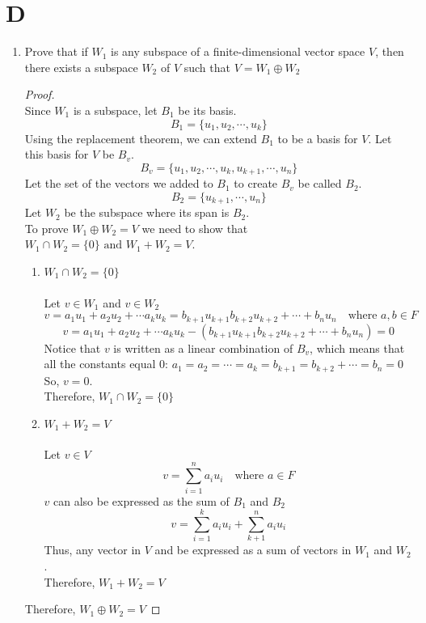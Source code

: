 \documentclass[11pt]{scrartcl}
\begin{document}
\section{D}
\begin{enumerate}[label=\alph*.]
	\item{
			Prove that if $W_1$ is any subspace of a finite-dimensional vector space $V$, then there exists a subspace $W_2$ of	$V$ such that $V = W_1 \oplus W_2 $
			\begin{proof}
			\-\\
			Since $W_1$ is a subspace, let $B_1$ be its basis.
			$$B_1 = \{u_1, u_2, \cdots, u_k\}$$
			Using the replacement theorem, we can extend $B_1$ to be a basis for $V$. Let this basis for $V$ be $B_v$.
			$$B_v = \{u_1, u_2, \cdots, u_k, u_{k+1}, \cdots, u_n\}$$
			Let the set of the vectors we added to $B_1$ to create $B_v$ be called $B_2$. 
			$$B_2 = \{u_{k+1}, \cdots, u_n\}$$
			Let $W_2$ be the subspace where its span is $B_2$.\\
			To prove $W_1 \oplus W_2 = V$ we need to show that $W_1 \cap W_2 = \{0\} \text{ and } W_1 + W_2 = V$.
			\begin{enumerate}[label=\roman*.]
				\item{
				$W_1 \cap W_2 = \{0\}\ $\\
				\-\\
				Let $v \in W_1$ and $v \in W_2$
				$$ v = a_1u_1 + a_2u_2 + \cdots a_ku_k = b_{k+1}u_{k+1} b_{k+2}u_{k+2} + \cdots + b_nu_n \quad \text{where } a,b \in F $$
				$$ v = a_1u_1 + a_2u_2 + \cdots a_ku_k -(b_{k+1}u_{k+1} b_{k+2}u_{k+2} + \cdots + b_nu_n) = 0 $$
				Notice that $v$ is written as a linear combination of $B_v$, which means that all the constants equal 0: $a_1 = a_2 = \cdots = a_k = b_{k+1} = b_{k+2} + \cdots = b_{n} = 0$\\
				So, $v = 0$.\\
				Therefore, $W_1 \cap W_2 = \{0\}\ $
				}
				\item{
				$W_1 + W_2 = V$\\
				\-\\
				Let $v \in V$
				$$ v = \sum_{i=1}^{n}a_iu_i \quad \text{where } a \in F$$
				$v$ can also be expressed as the sum of $B_1$ and $B_2$\\
				$$ v = \sum_{i=1}^{k}a_iu_i + \sum_{k+1}^{n}a_iu_i $$
				Thus, any vector in $V$ and be expressed as a sum of vectors in $W_1$ and $W_2$.\\
				Therefore, $W_1 + W_2 = V$
				}
			\end{enumerate}
			Therefore, $W_1 \oplus W_2 = V$

\end{proof}}
\end{enumerate}
\end{document}
